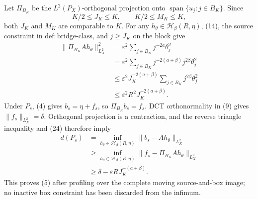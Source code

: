 Let \(\Pi_{B_K}\) be the \(L^2(P_X)\)-orthogonal projection onto \(\operatorname{span}\{u_j:j\in B_K\}\).  Since
\[
K/2\le J_K\le K,
\qquad
K/2\le M_K\le K,
\tag{23}
\]
both \(J_K\) and \(M_K\) are comparable to \(K\).  For any \(h_\theta\in\mathcal H_\beta(R,\eta)\), (14), the source constraint in \(\mathrm{def:bridge\mbox{-}class}\), and \(j\ge J_K\) on the block give
\[
\begin{aligned}
\|\Pi_{B_K}Ah_\theta\|_{L^2_X}^2
&=\varepsilon^2\sum_{j\in B_K}j^{-2a}\theta_j^2 \\
&=\varepsilon^2\sum_{j\in B_K}j^{-2(a+\beta)}j^{2\beta}\theta_j^2 \\
&\le\varepsilon^2J_K^{-2(a+\beta)}
       \sum_{j\in B_K}j^{2\beta}\theta_j^2 \\
&\le\varepsilon^2R^2J_K^{-2(a+\beta)}.
\end{aligned}
\tag{24}
\]
Under \(P_s\), (4) gives \(b_s=\eta+f_s\), so \(\Pi_{B_K}b_s=f_s\).  DCT orthonormality in (9) gives \(\|f_s\|_{L^2_X}=\delta\).  Orthogonal projection is a contraction, and the reverse triangle inequality and (24) therefore imply
\[
\begin{aligned}
d(P_s)
&=\inf_{h_\theta\in\mathcal H_\beta(R,\eta)}
  \|b_s-Ah_\theta\|_{L^2_X} \\
&\ge\inf_{h_\theta\in\mathcal H_\beta(R,\eta)}
  \|f_s-\Pi_{B_K}Ah_\theta\|_{L^2_X} \\
&\ge\delta-\varepsilon R J_K^{-(a+\beta)}.
\end{aligned}
\tag{25}
\]
This proves (5) after profiling over the complete moving source-and-box image; no inactive box constraint has been discarded from the infimum.

